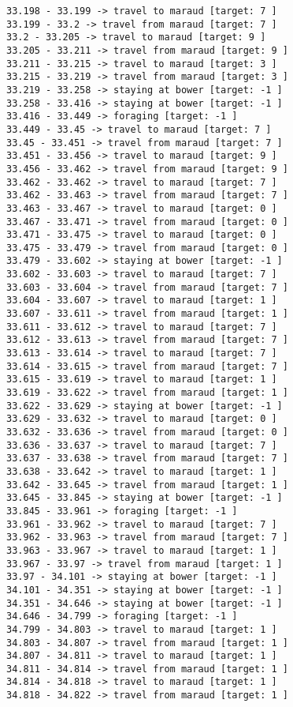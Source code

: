 \documentclass[11pt]{article}
\begin{document}
\begin{Verbatim}[commandchars=\\\{\}]
33.198 - 33.199 -> travel to maraud [target: 7 ]
33.199 - 33.2 -> travel from maraud [target: 7 ]
33.2 - 33.205 -> travel to maraud [target: 9 ]
33.205 - 33.211 -> travel from maraud [target: 9 ]
33.211 - 33.215 -> travel to maraud [target: 3 ]
33.215 - 33.219 -> travel from maraud [target: 3 ]
33.219 - 33.258 -> staying at bower [target: -1 ]
33.258 - 33.416 -> staying at bower [target: -1 ]
33.416 - 33.449 -> foraging [target: -1 ]
33.449 - 33.45 -> travel to maraud [target: 7 ]
33.45 - 33.451 -> travel from maraud [target: 7 ]
33.451 - 33.456 -> travel to maraud [target: 9 ]
33.456 - 33.462 -> travel from maraud [target: 9 ]
33.462 - 33.462 -> travel to maraud [target: 7 ]
33.462 - 33.463 -> travel from maraud [target: 7 ]
33.463 - 33.467 -> travel to maraud [target: 0 ]
33.467 - 33.471 -> travel from maraud [target: 0 ]
33.471 - 33.475 -> travel to maraud [target: 0 ]
33.475 - 33.479 -> travel from maraud [target: 0 ]
33.479 - 33.602 -> staying at bower [target: -1 ]
33.602 - 33.603 -> travel to maraud [target: 7 ]
33.603 - 33.604 -> travel from maraud [target: 7 ]
33.604 - 33.607 -> travel to maraud [target: 1 ]
33.607 - 33.611 -> travel from maraud [target: 1 ]
33.611 - 33.612 -> travel to maraud [target: 7 ]
33.612 - 33.613 -> travel from maraud [target: 7 ]
33.613 - 33.614 -> travel to maraud [target: 7 ]
33.614 - 33.615 -> travel from maraud [target: 7 ]
33.615 - 33.619 -> travel to maraud [target: 1 ]
33.619 - 33.622 -> travel from maraud [target: 1 ]
33.622 - 33.629 -> staying at bower [target: -1 ]
33.629 - 33.632 -> travel to maraud [target: 0 ]
33.632 - 33.636 -> travel from maraud [target: 0 ]
33.636 - 33.637 -> travel to maraud [target: 7 ]
33.637 - 33.638 -> travel from maraud [target: 7 ]
33.638 - 33.642 -> travel to maraud [target: 1 ]
33.642 - 33.645 -> travel from maraud [target: 1 ]
33.645 - 33.845 -> staying at bower [target: -1 ]
33.845 - 33.961 -> foraging [target: -1 ]
33.961 - 33.962 -> travel to maraud [target: 7 ]
33.962 - 33.963 -> travel from maraud [target: 7 ]
33.963 - 33.967 -> travel to maraud [target: 1 ]
33.967 - 33.97 -> travel from maraud [target: 1 ]
33.97 - 34.101 -> staying at bower [target: -1 ]
34.101 - 34.351 -> staying at bower [target: -1 ]
34.351 - 34.646 -> staying at bower [target: -1 ]
34.646 - 34.799 -> foraging [target: -1 ]
34.799 - 34.803 -> travel to maraud [target: 1 ]
34.803 - 34.807 -> travel from maraud [target: 1 ]
34.807 - 34.811 -> travel to maraud [target: 1 ]
34.811 - 34.814 -> travel from maraud [target: 1 ]
34.814 - 34.818 -> travel to maraud [target: 1 ]
34.818 - 34.822 -> travel from maraud [target: 1 ]

\end{Verbatim}
\end{document}
